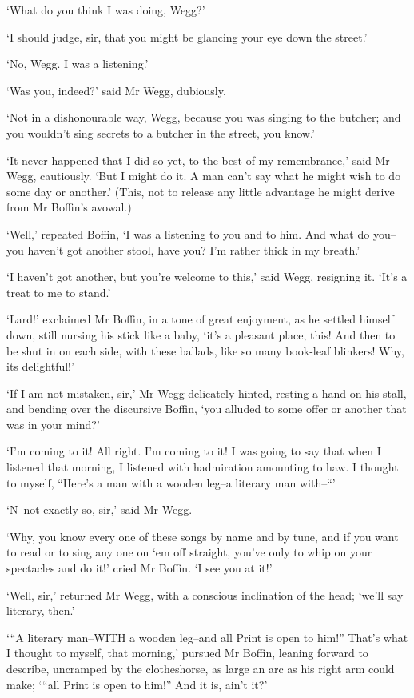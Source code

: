 ‘What do you think I was doing, Wegg?’

‘I should judge, sir, that you might be glancing your eye down the
street.’

‘No, Wegg. I was a listening.’

‘Was you, indeed?’ said Mr Wegg, dubiously.

‘Not in a dishonourable way, Wegg, because you was singing to the
butcher; and you wouldn’t sing secrets to a butcher in the street, you
know.’

‘It never happened that I did so yet, to the best of my remembrance,’
said Mr Wegg, cautiously. ‘But I might do it. A man can’t say what he
might wish to do some day or another.’ (This, not to release any little
advantage he might derive from Mr Boffin’s avowal.)

‘Well,’ repeated Boffin, ‘I was a listening to you and to him. And what
do you--you haven’t got another stool, have you? I’m rather thick in my
breath.’

‘I haven’t got another, but you’re welcome to this,’ said Wegg,
resigning it. ‘It’s a treat to me to stand.’

‘Lard!’ exclaimed Mr Boffin, in a tone of great enjoyment, as he settled
himself down, still nursing his stick like a baby, ‘it’s a pleasant
place, this! And then to be shut in on each side, with these ballads,
like so many book-leaf blinkers! Why, its delightful!’

‘If I am not mistaken, sir,’ Mr Wegg delicately hinted, resting a hand
on his stall, and bending over the discursive Boffin, ‘you alluded to
some offer or another that was in your mind?’

‘I’m coming to it! All right. I’m coming to it! I was going to say that
when I listened that morning, I listened with hadmiration amounting to
haw. I thought to myself, “Here’s a man with a wooden leg--a literary
man with--“’

‘N--not exactly so, sir,’ said Mr Wegg.

‘Why, you know every one of these songs by name and by tune, and if you
want to read or to sing any one on ‘em off straight, you’ve only to whip
on your spectacles and do it!’ cried Mr Boffin. ‘I see you at it!’

‘Well, sir,’ returned Mr Wegg, with a conscious inclination of the head;
‘we’ll say literary, then.’

‘“A literary man--WITH a wooden leg--and all Print is open to him!”
 That’s what I thought to myself, that morning,’ pursued Mr Boffin,
leaning forward to describe, uncramped by the clotheshorse, as large an
arc as his right arm could make; ‘“all Print is open to him!” And it is,
ain’t it?’

